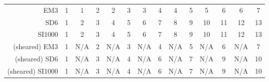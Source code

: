 \begin{tabular}{| r | c | c | c | c | c | c | c | c | c | c | c | c | c |}
    \hline
                 EM3 &                1 &                1 &                2 &                2 &                3 &                3 &                4 &                4 &                5 &                5 &                6 &                6 &                7 \\
                 SD6 &                1 &                2 &                3 &                4 &                5 &                6 &                7 &                8 &                9 &               10 &               11 &               12 &               13 \\
              SI1000 &                1 &                2 &                3 &                4 &                5 &                6 &                7 &                8 &                9 &               10 &               11 &               12 &               13 \\
          (sheared) EM3 &                1 &              N/A &                2 &              N/A &                3 &              N/A &                4 &              N/A &                5 &              N/A &                6 &              N/A &                7 \\
          (sheared) SD6 &                1 &              N/A &                3 &              N/A &                4 &              N/A &                6 &              N/A &                7 &              N/A &                9 &              N/A &               10 \\
       (sheared) SI1000 &                1 &              N/A &                3 &              N/A &                4 &              N/A &                6 &              N/A &                7 &              N/A &                9 &              N/A &               10 \\
    \hline
\end{tabular}